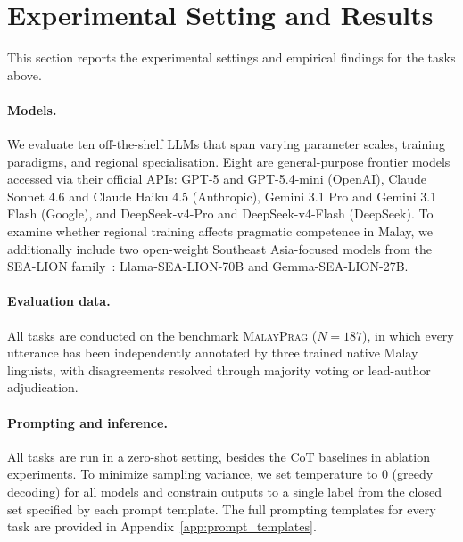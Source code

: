 \documentclass[11pt]{article}
\begin{document}
\section{Experimental Setting and Results}
This section reports the experimental settings and empirical findings for the tasks above.

\paragraph{Models.} We evaluate ten off-the-shelf LLMs that span varying parameter scales, training paradigms, and regional specialisation. Eight are general-purpose frontier models accessed via their official APIs: GPT-5 and GPT-5.4-mini (OpenAI), Claude Sonnet 4.6 and Claude Haiku 4.5 (Anthropic), Gemini 3.1 Pro and Gemini 3.1 Flash (Google), and DeepSeek-v4-Pro and DeepSeek-v4-Flash (DeepSeek). To examine whether regional training affects pragmatic competence in Malay, we additionally include two open-weight Southeast Asia-focused models from the SEA-LION family~\citep{ng2025sea,koh2025mitigating}: Llama-SEA-LION-70B and Gemma-SEA-LION-27B. 

\paragraph{Evaluation data.} All tasks are conducted on the benchmark \textsc{MalayPrag} ($N=187$), in which every utterance has been independently annotated by three trained native Malay linguists, with disagreements resolved through majority voting or lead-author adjudication. 

\paragraph{Prompting and inference.} All tasks are run in a zero-shot setting, besides the CoT baselines in ablation experiments. 
To minimize sampling variance, we set temperature to $0$ (greedy decoding) for all models and constrain outputs to a single label from the closed set specified by each prompt template. The full prompting templates for every task are provided in Appendix~\ref{app:prompt_templates}.
\end{document}
